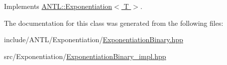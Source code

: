 Implements \hyperlink{classANTL_1_1Exponentiation_aad4e3be9ab770361f04a10a85d390622}{A\-N\-T\-L\-::\-Exponentiation$<$ T $>$}.



The documentation for this class was generated from the following files\-:\begin{DoxyCompactItemize}
\item 
include/\-A\-N\-T\-L/\-Exponentiation/\hyperlink{ExponentiationBinary_8hpp}{Exponentiation\-Binary.\-hpp}\item 
src/\-Exponentiation/\hyperlink{ExponentiationBinary__impl_8hpp}{Exponentiation\-Binary\-\_\-impl.\-hpp}\end{DoxyCompactItemize}
